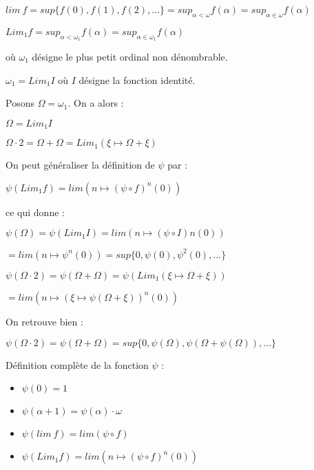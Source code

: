 \documentclass[12pt]{beamer}
\begin{document}
\begin{frame}

\small

\( lim\ f = sup \lbrace f(0), f(1), f(2), ... \rbrace = sup_{\alpha < \omega} f(\alpha) = sup_{\alpha \in \omega} f(\alpha) \)

\( Lim_1 f = sup_{\alpha < \omega_1} f(\alpha) = sup_{\alpha \in \omega_1} f(\alpha) \)

où \( \omega_1 \) désigne le plus petit ordinal non dénombrable.

\( \omega_1 = Lim_1 I \) où $I$ désigne la fonction identité.

Posons \( \Omega = \omega_1 \). On a alors :

\( \Omega = Lim_1 I \)

\( \Omega \cdot 2 = \Omega + \Omega = Lim_1 ( \xi \mapsto \Omega + \xi ) \)

On peut généraliser la définition de \( \psi \) par :

\( \psi(Lim_1 f) = lim (n \mapsto (\psi \circ f)^n (0)) \)

ce qui donne :

\( \psi(\Omega) = \psi(Lim_1 I) = lim (n \mapsto (\psi \circ I)n (0)) \)

\( = lim (n \mapsto \psi^n(0)) = sup \lbrace 0, \psi(0), \psi^2(0), \ldots \rbrace \)

\( \psi(\Omega \cdot 2) = \psi(\Omega+\Omega) = \psi(Lim_1(\xi \mapsto \Omega+\xi)) \)

\( = lim (n \mapsto (\xi \mapsto \psi(\Omega+\xi))^n(0)) \)

On retrouve bien :

\( \psi(\Omega \cdot 2) = \psi(\Omega+\Omega) = sup \lbrace 0, \psi(\Omega), \psi(\Omega+\psi(\Omega)), \ldots \rbrace \)

\end{frame}
\begin{frame}

Définition complète de la fonction \( \psi \) :

\begin{itemize}
     \setlength{\itemsep}{1pt}
     \setlength{\parskip}{0pt}
     \setlength{\parsep}{0pt}
\item \( \psi(0) = 1 \)
\item \( \psi(\alpha+1) = \psi(\alpha) \cdot \omega \)
\item \( \psi(lim\ f) = lim (\psi \circ f) \)
\item \( \psi(Lim_1 f) = lim (n \mapsto (\psi \circ f)^n (0)) \)
\end{itemize}

\end{frame}
\end{document}
